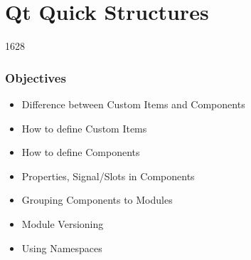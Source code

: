 %
%
%
%

\section{Qt Quick Structures}

\begin{slide}{1628}\frametitle{Objectives}

\begin{itemize}
  \item Difference between Custom Items and Components
  \item How to define Custom Items
  \item How to define Components
  \item Properties, Signal/Slots in Components
  \item Grouping Components to Modules
  \item Module Versioning
  \item Using Namespaces         
\end{itemize}
  
\end{slide}                                     




